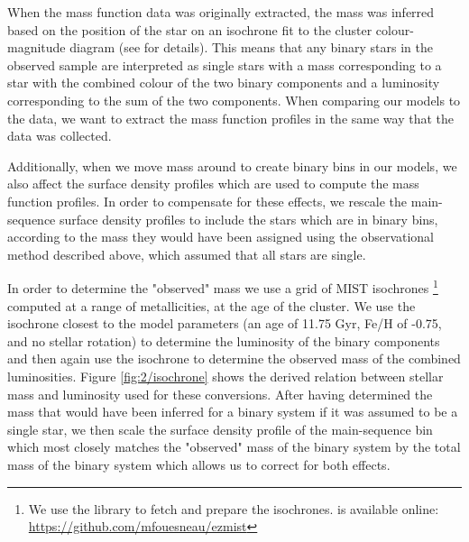 When the mass function data was originally extracted, the mass was inferred based on the position of
the star on an isochrone fit to the cluster colour-magnitude diagram (see \citealt{Sollima2017} for
details). This means that any binary stars in the observed sample are interpreted as single stars
with a mass corresponding to a star with the combined colour of the two binary components and a
luminosity corresponding to the sum of the two components. When comparing our models to the data, we
want to extract the mass function profiles in the same way that the data was collected.

Additionally, when we move mass around to create binary bins in our models, we also affect the
surface density profiles which are used to compute the mass function profiles. In order to
compensate for these effects, we rescale the main-sequence surface density profiles to include the
stars which are in binary bins, according to the mass they would have been assigned using the
observational method described above, which assumed that all stars are single.

In order to determine the "observed" mass we use a grid of MIST isochrones
\citep{Dotter2016,Choi2016}\footnote{We use the  library to fetch and prepare the
isochrones.  is available online: \url{https://github.com/mfouesneau/ezmist}} computed
at a range of metallicities, at the age of the cluster. We use the isochrone closest to the model
parameters (an age of 11.75 Gyr, Fe/H of -0.75, and no stellar rotation) to determine the luminosity
of the binary components and then again use the isochrone to determine the observed mass of the
combined luminosities. Figure \ref{fig:2/isochrone} shows the derived relation between stellar mass
and luminosity used for these conversions. After having determined the mass that would have been
inferred for a binary system if it was assumed to be a single star, we then scale the surface
density profile of the main-sequence bin which most closely matches the "observed" mass of the
binary system by the total mass of the binary system which allows us to correct for both effects.


